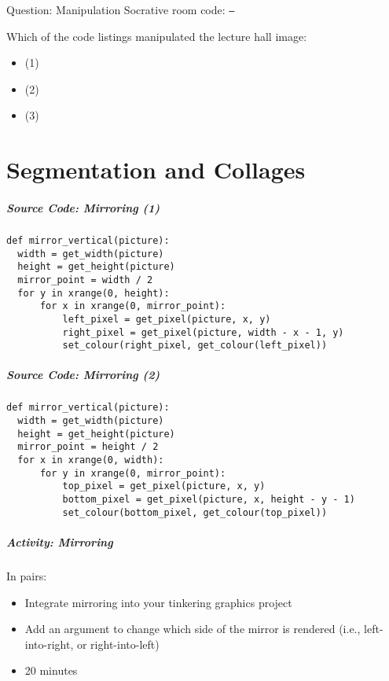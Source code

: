 \begin{frame}{Question: Manipulation}
	Socrative room code: \texttt{---}
	
	\vspace{2em}
	
	Which of the code listings manipulated the lecture hall image:
	
	\begin{itemize}
    		\item (1)
    		\item (2)
    		\item (3)
	\end{itemize}
\end{frame}

\part{Segmentation and Collages}
\frame{\partpage}


\begin{frame}[fragile]
	\frametitle{Source Code: Mirroring (1)}
	
\begin{lstlisting}
def mirror_vertical(picture):
  width = get_width(picture)
  height = get_height(picture)
  mirror_point = width / 2
  for y in xrange(0, height):
      for x in xrange(0, mirror_point):
          left_pixel = get_pixel(picture, x, y)
          right_pixel = get_pixel(picture, width - x - 1, y)
          set_colour(right_pixel, get_colour(left_pixel))
\end{lstlisting}

\end{frame}

\begin{frame}[fragile]
	\frametitle{Source Code: Mirroring (2)}
	
\begin{lstlisting}
def mirror_vertical(picture):
  width = get_width(picture)
  height = get_height(picture)
  mirror_point = height / 2
  for x in xrange(0, width):
      for y in xrange(0, mirror_point):
          top_pixel = get_pixel(picture, x, y)
          bottom_pixel = get_pixel(picture, x, height - y - 1)
          set_colour(bottom_pixel, get_colour(top_pixel))
\end{lstlisting}

\end{frame}

\begin{frame}
	\frametitle{Activity: Mirroring}
	
	In pairs:
	
	\vspace{2em}
	
	\begin{itemize}		
		\item Integrate mirroring into your tinkering graphics project
		\item Add an argument to change which side of the mirror is rendered (i.e., left-into-right, or right-into-left)
		\item 20 minutes
	\end{itemize}
\end{frame}

